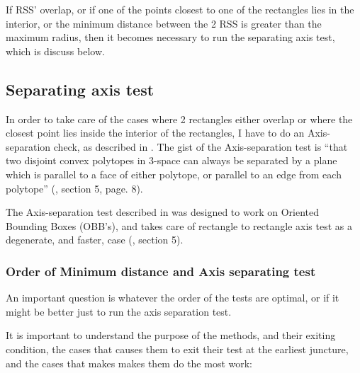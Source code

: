 If RSS' overlap, or if one of the points closest to one of the rectangles lies in the interior, or the minimum distance between the 2 RSS is greater than the maximum radius, then it becomes necessary to run the separating axis test, which is discuss below.

\subsection{Separating axis test}
\label{sepAxis}
In order to take care of the cases where 2 rectangles either overlap or where the closest point lies inside the interior of the rectangles, I have to do an Axis-separation check, as described in \cite{237244}. The gist of the Axis-separation test is ``that two disjoint convex polytopes in 3-space can always be separated by a plane which is parallel to a face of either polytope, or parallel to an edge from each polytope'' (\cite{237244}, section 5, page. 8).

The Axis-separation test described in \cite{237244} was designed to work on Oriented Bounding Boxes (OBB's), and takes care of rectangle to rectangle axis test as a degenerate, and faster, case (\cite{237244}, section 5). 




\subsubsection{Order of Minimum distance and Axis separating test}
\label{minAxisOrder}
An important question is whatever the order of the tests are optimal, or if it might be better just to run the axis separation test.

It is important to understand the purpose of the methods, and their exiting condition, the cases that causes them to exit their test at the earliest juncture, and the cases that makes makes them do the most work:

